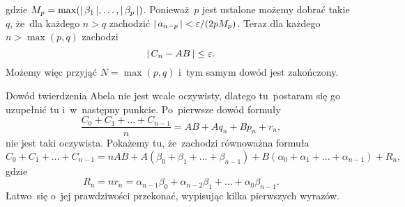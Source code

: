 \documentclass[a4paper,11pt]{article}
\begin{document}
gdzie
$M_{ p } = \max( |\, {  \beta_{ 1 }  } \,|, \ldots, |\, {  \beta_{ p }  } \,| )$.
Ponieważ~$p$ jest ustalone możemy dobrać takie $q$, że~dla każdego
$n > q$ zachodzić $|\, {  a_{ n - p }  } \,| < \varepsilon / ( 2 p M_{ p } )$.
Teraz dla każdego $n > \max( p, q )$ zachodzi
\begin{equation}
  \label{eq:Leja-18}
  |\, {  C_{ n } - AB  } \,| \leq \varepsilon.
\end{equation}
Możemy więc przyjąć $N = \max( p, q )$ i~tym samym dowód jest
zakończony.

\vspace{\spaceFour}



\start {} Dowód twierdzenia Abela nie jest wcale oczywisty,
dlatego tu~postaram się go uzupełnić tu i~w~następny punkcie.
Po~pierwsze dowód formuły
\begin{equation}
  \label{eq:Leja-19}
  \frac{ C_{ 0 } + C_{ 1 } + \ldots + C_{ n - 1 } }{ n }
  = AB + A q_{ n } + B p_{ n } + r_{ n },
\end{equation}
nie jest taki oczywista. Pokażemy tu, że~zachodzi równoważna formuła
\begin{equation}
  \label{eq:Leja-20}
  C_{ 0 } + C_{ 1 } + \ldots + C_{ n - 1 }
  = n AB + A ( \beta_{ 0 } + \beta_{ 1 } + \ldots + \beta_{ n - 1 } )
  + B ( \alpha_{ 0 } + \alpha_{ 1 } + \ldots + \alpha_{ n - 1 } ) + R_{ n },
\end{equation}
gdzie
\begin{equation}
  \label{eq:Leja-21}
  R_{ n } = n r_{ n } =
  \alpha_{ n - 1 } \beta_{ 0 } + \alpha_{ n - 2 } \beta_{ 1 } + \ldots + \alpha_{ 0 } \beta_{ n - 1 }.
\end{equation}
Łatwo~się o~jej prawdziwości przekonać, wypisując kilka pierwszych
wyrazów.
\end{document}
